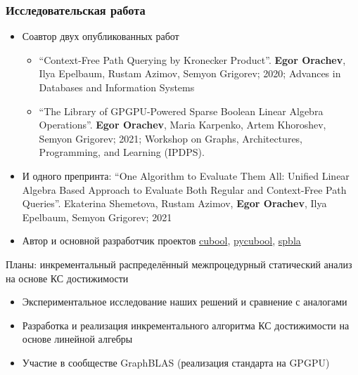 \documentclass[xcolor=table,aspectratio=169]{beamer}
\begin{document}
            


\begin{frame}[fragile] \frametitle{Исследовательская работа}
  
    \begin{itemize}
        \item Соавтор двух опубликованных работ
            \begin{itemize}
              \item ``Context-Free Path Querying by Kronecker Product''. \textbf{Egor Orachev}, Ilya Epelbaum, Rustam Azimov, Semyon Grigorev; 2020; Advances in Databases and Information Systems
              \item ``The Library of GPGPU-Powered Sparse Boolean Linear Algebra Operations''. \textbf{Egor Orachev}, Maria Karpenko, Artem Khoroshev, Semyon Grigorev; 2021; Workshop on Graphs, Architectures, Programming, and Learning (IPDPS).
            \end{itemize}

        \item И одного препринта: ``One Algorithm to Evaluate Them All: Unified Linear Algebra Based Approach to Evaluate Both Regular and Context-Free Path Queries''. Ekaterina Shemetova, Rustam Azimov, \textbf{Egor Orachev}, Ilya Epelbaum, Semyon Grigorev; 2021
        \item Автор и основной разработчик проектов \href{https://github.com/JetBrains-Research/cuBool}{cubool}, \href{https://pypi.org/project/pycubool/}{pycubool}, \href{https://github.com/JetBrains-Research/spbla}{spbla}
    \end{itemize}
  \pause
  \vfill
  Планы: инкрементальный распределённый межпроцедурный статический анализ на основе КС достижимости
  \begin{itemize}
        \item Экспериментальное исследование наших решений и сравнение с аналогами
        \item Разработка и реализация инкрементального алгоритма КС достижимости на основе линейной алгебры
        \item Участие в сообществе GraphBLAS (реализация стандарта на GPGPU)
  \end{itemize}

\end{frame}
\end{document}
